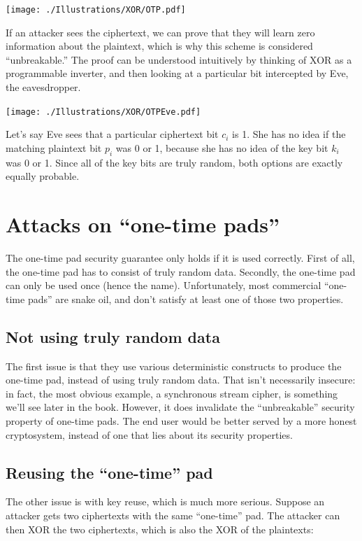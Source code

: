 \documentclass[11pt,ebook,table,dvipsnames]{memoir}
\begin{document}
\texttt{[image: ./Illustrations/XOR/OTP.pdf]}

If an attacker sees the ciphertext, we can prove that they will learn
zero information about the plaintext, which is why this scheme is
considered \enquote{unbreakable.} The proof can be understood intuitively by
thinking of XOR as a programmable inverter, and then looking at a
particular bit intercepted by Eve, the eavesdropper.

\texttt{[image: ./Illustrations/XOR/OTPEve.pdf]}

Let's say Eve sees that a particular ciphertext bit $c_i$ is 1. She
has no idea if the matching plaintext bit $p_i$ was 0 or 1, because
she has no idea of the key bit $k_i$ was 0 or 1. Since all of the key
bits are truly random, both options are exactly equally probable.
\section{Attacks on \enquote{one-time pads}}
\label{sec-2-1-5}

The one-time pad security guarantee only holds if it is used
correctly. First of all, the one-time pad has to consist of truly
random data. Secondly, the one-time pad can only be used once (hence
the name). Unfortunately, most commercial \enquote{one-time pads} are snake
oil, and don't satisfy at least one of those two properties.

\subsection{Not using truly random data}
\label{sec-2-1-5-1}

The first issue is that they use various deterministic constructs to
produce the one-time pad, instead of using truly random data. That
isn't necessarily insecure: in fact, the most obvious example, a
synchronous \gls{stream cipher}, is something we'll see later in the
book. However, it does invalidate the \enquote{unbreakable} security property
of one-time pads. The end user would be better served by a more honest
cryptosystem, instead of one that lies about its security properties.
\subsection{Reusing the \enquote{one-time} pad}
\label{sec-2-1-5-2}

The other issue is with key reuse, which is much more serious. Suppose
an attacker gets two ciphertexts with the same \enquote{one-time} pad. The
attacker can then XOR the two ciphertexts, which is also the XOR of
the plaintexts:
\end{document}
